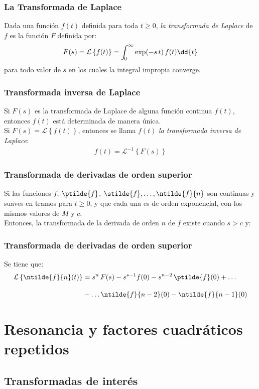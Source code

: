\begin{frame}
\frametitle{La Transformada de Laplace}
Dada una función $f(t)$ definida para toda $t \geq 0$, \emph{la transformada de Laplace} de $f$ es la función $F$ definida por:
\pause
\begin{align*}
F(s) = \mathcal{L} \left\{ f(t) \right\} = \scaleint{5ex}_{\bs 0}^{\infty} \exp(-s \, t) \, f(t) \dd{t}
\end{align*}
para todo valor de $s$ en los cuales la integral impropia converge.
\end{frame}
\begin{frame}
\frametitle{Transformada inversa de Laplace}
Si $F(s)$ es la transformada de Laplace de alguna función continua $f(t)$, \pause entonces $f(t)$ está determinada de manera única.
\\
\bigskip
\pause
Si $F(s) = \mathcal{L} \left\{ f(t) \right\}$, entonces se llama $f(t)$ \emph{la transformada inversa de Laplace}:
\begin{align*}
f(t) = \mathcal{L}^{-1} \left\{ F(s) \right\}
\end{align*}
\end{frame}
\begin{frame}
\frametitle{Transformada de derivadas de orden superior}
Si las funciones $f$, $\ptilde{f}$, $\stilde{f}, \ldots, \ntilde{f}{n}$ son continuas y suaves en tramos para $t \geq 0$, y que cada una es de orden exponencial, con los mismos valores de $M$ y $c$.
\\
\bigskip
\pause
Entonces, la transformada de la derivada de orden $n$ de $f$ existe cuando $s > c$ y:
\end{frame}
\begin{frame}
\frametitle{Transformada de derivadas de orden superior}
Se tiene que:
\begin{align*}
\mathcal{L} \left\{ \ntilde{f}{n} (t) \right\} &= s^{n} \, F(s) - s^{s-1} f(0) - s^{n-2} \, \ptilde{f}(0) + \ldots \\[1em]
&- \ldots \ntilde{f}{n-2}(0) - \ntilde{f}{n-1}(0)
\end{align*}

\end{frame}

\section{Resonancia y factores cuadráticos repetidos}
\subsection{Transformadas de interés}

